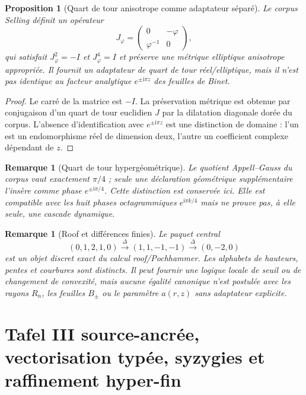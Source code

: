 \documentclass[11pt,a4paper]{article}
\newtheorem{proposition}[theorem]{Proposition}
\newtheorem{remark}[theorem]{Remarque}
\newcommand{\ii}{\mathrm i}
\newcommand{\ph}{\varphi}
\begin{document}
\begin{proposition}[Quart de tour anisotrope comme adaptateur séparé]
Le corpus Selling définit un opérateur
\[
 J_\ph=\begin{pmatrix}0&-\ph\\ \ph^{-1}&0\end{pmatrix},
\]
qui satisfait $J_\ph^2=-I$ et $J_\ph^4=I$ et préserve une métrique elliptique anisotrope appropriée. Il fournit un adaptateur de quart de tour réel/elliptique, mais il n'est pas identique au facteur analytique $e^{\pm\ii\pi z}$ des feuilles de Binet.
\end{proposition}

\begin{proof}
Le carré de la matrice est $-I$. La préservation métrique est obtenue par conjugaison d'un quart de tour euclidien $J$ par la dilatation diagonale dorée du corpus. L'absence d'identification avec $e^{\pm\ii\pi z}$ est une distinction de domaine : l'un est un endomorphisme réel de dimension deux, l'autre un coefficient complexe dépendant de $z$.
\end{proof}

\begin{remark}[Quart de tour hypergéométrique]
Le quotient Appell--Gauss du corpus vaut exactement $\pi/4$ ; seule une déclaration géométrique supplémentaire l'insère comme phase $e^{\pm\ii\pi/4}$. Cette distinction est conservée ici. Elle est compatible avec les huit phases octagrammiques $e^{\ii\pi k/4}$ mais ne prouve pas, à elle seule, une cascade dynamique.
\end{remark}

\begin{remark}[Roof et différences finies]
Le paquet central
\[
 (0,1,2,1,0)\xrightarrow{\Delta}(1,1,-1,-1)
 \xrightarrow{\Delta}(0,-2,0)
\]
est un objet discret exact du calcul roof/Pochhammer. Les alphabets de hauteurs, pentes et courbures sont distincts. Il peut fournir une logique locale de seuil ou de changement de convexité, mais aucune égalité canonique n'est postulée avec les rayons $R_n$, les feuilles $B_\pm$ ou le paramètre $a(r,z)$ sans adaptateur explicite.
\end{remark}


\section{Tafel III source-ancrée, vectorisation typée, syzygies et raffinement hyper-fin}\label{sec:v37-tafel-vector-syzygy}
\end{document}
